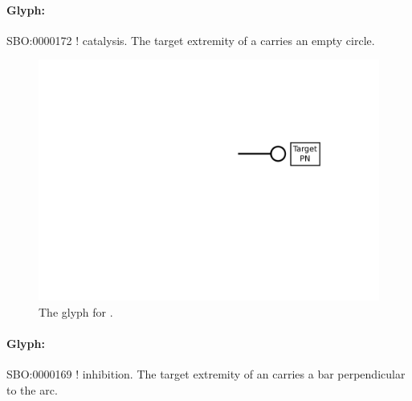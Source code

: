 \paragraph{Glyph: }\label{sec:techref:catalysis}


\begin{glyphDescription}
 \glyphSboTerm SBO:0000172 ! catalysis.
 \glyphNode The target extremity of a  carries an empty circle.
 \end{glyphDescription}

\begin{figure}[htb]
  \centering
  \includegraphics[scale = 0.5]{images/catalysis}
  \caption{The \PD glyph for .}
  \label{fig:techref:catalysis}
\end{figure}


\paragraph{Glyph: }\label{sec:techref:inhibition}


\begin{glyphDescription}
 \glyphSboTerm SBO:0000169 ! inhibition.
 \glyphNode The target extremity of an  carries a bar perpendicular to the arc.
 \end{glyphDescription}

